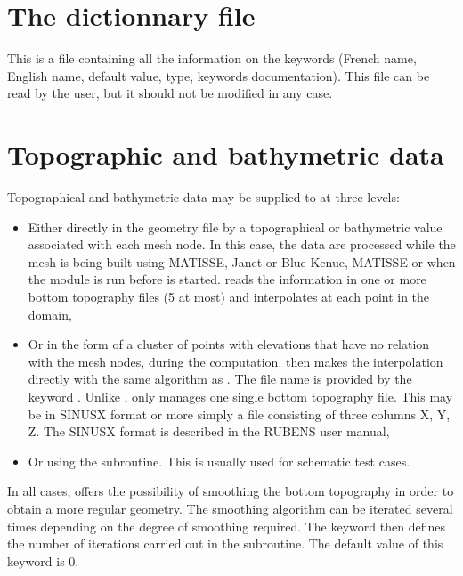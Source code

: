 \section{The dictionnary file}

This is a file containing all the information on the keywords (French name,
English name, default value, type, keywords documentation). This file can be
read by the user, but it should not be modified in any case.

\section{Topographic and bathymetric data}
\label{sec:topo}
Topographical and bathymetric data may be supplied to  at three
levels:

\begin{itemize}
\item Either directly in the geometry file by a topographical or bathymetric
value associated with each mesh node. In this case, the data are processed
while the mesh is being built using MATISSE, Janet or Blue Kenue, MATISSE or
when the \bief module is run before  is started. \bief reads
the information in one or more bottom topography files (5 at most) and
interpolates at each point in the domain,

\item Or in the form of a cluster of points with elevations that have no
relation with the mesh nodes, during the  computation. 
then makes the interpolation directly with the same algorithm as \bief. The
file name is provided by the keyword . Unlike
\bief,  only manages one single bottom topography file. This may be
in SINUSX format or more simply a file consisting of three columns X, Y, Z. The
SINUSX format is described in the RUBENS user manual,

\item Or using the  subroutine. This is usually used for schematic
test cases.
\end{itemize}

In all cases,  offers the possibility of smoothing the bottom
topography in order to obtain a more regular geometry. The smoothing algorithm
can be iterated several times depending on the degree of smoothing required.
The keyword  then defines the number of
iterations carried out in the  subroutine. The default
value of this keyword is 0.
